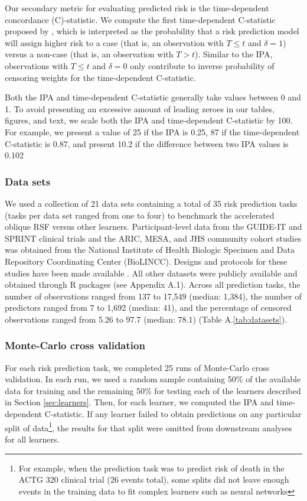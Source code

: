 \documentclass[twoside,11pt]{article}\usepackage[]{graphicx}\usepackage[]{xcolor}
\newcommand{\ie}{that is}
\newcommand{\secref}[1]{Section \ref{#1}}
\newcommand{\tabrefAppendix}[1]{Table A.\ref{#1}}
\begin{document}
Our secondary metric for evaluating predicted risk is the time-dependent concordance (C)-statistic. We compute the first time-dependent C-statistic proposed by \citet[][Equation~3]{blanche2013estimating}, which is interpreted as the probability that a risk prediction model will assign higher risk to a case (\ie, an observation with $T \leq t$ and $\delta = 1$) versus a non-case (\ie, an observation with $T > t$). Similar to the IPA, observations with $T \leq t$ and $\delta = 0$ only contribute to inverse probability of censoring weights for the time-dependent C-statistic.

Both the IPA and time-dependent C-statistic generally take values between 0 and 1. To avoid presenting an excessive amount of leading zeroes in our tables, figures, and text, we scale both the IPA and time-dependent C-statistic by 100. For example, we present a value of 25 if the IPA is 0.25, 87 if the time-dependent C-statistic is 0.87, and present 10.2 if the difference between two IPA values is 0.102

\subsubsection{Data sets}

We used a collection of 21 data sets containing a total of 35 risk prediction tasks (tasks per data set ranged from one to four) to benchmark the accelerated oblique RSF versus other learners. Participant-level data from the GUIDE-IT and SPRINT clinical trials and the ARIC, MESA, and JHS community cohort studies was obtained from the National Institute of Health Biologic Specimen and Data Repository Coordinating Center (BioLINCC). Designs and protocols for these studies have been made available \citep{aric1989atherosclerosis, bild2002multi, felker2017effect, sprint2015randomized, taylor2005toward}. All other datasets were publicly available and obtained through R packages (see Appendix A.1). Across all prediction tasks, the number of observations ranged from 137 to 17,549 (median: 1,384), the number of predictors ranged from 7 to 1,692 (median: 41), and the percentage of censored observations ranged from 5.26 to 97.7 (median: 78.1) (\tabrefAppendix{tab:datasets}).

\subsubsection{Monte-Carlo cross validation}

For each risk prediction task, we completed 25 runs of Monte-Carlo cross validation. In each run, we used a random sample containing 50\% of the available data for training and the remaining 50\% for testing each of the learners described in \secref{sec:learners}. Then, for each learner, we computed the IPA and time-dependent C-statistic. If any learner failed to obtain predictions on any particular split of data\footnote{For example, when the prediction task was to predict risk of death in the ACTG 320 clinical trial (26 events total), some splits did not leave enough events in the training data to fit complex learners such as neural networks}, the results for that split were omitted from downstream analyses for all learners.
\end{document}
